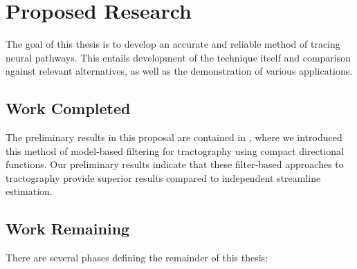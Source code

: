 \documentclass[letterpaper,hyperref,12pt]{gatech-thesis}
\begin{document}
\chapter{Proposed Research}

The goal of this thesis is to develop an accurate and reliable method of
tracing neural pathways.  This entails development of the technique itself and
comparison against relevant alternatives, as well as the demonstration of
various applications.

\section{Work Completed}
The preliminary results in this proposal are contained in
\cite{Malcolm2010watson,Rathi2009ismrm}, where we introduced this method of
model-based filtering for tractography using compact directional functions.
Our preliminary results indicate that these filter-based approaches to
tractography provide superior results compared to independent streamline
estimation.


\section{Work Remaining}

There are several phases defining the remainder of this thesis:
\end{document}
